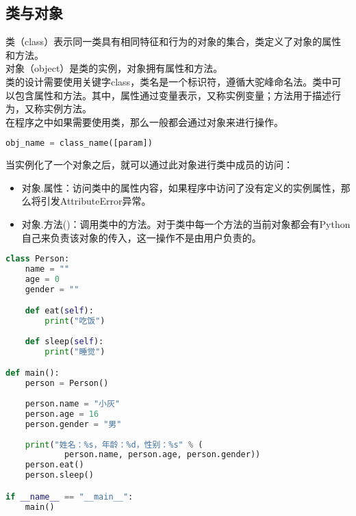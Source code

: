 \subsection{类与对象}

类（class）表示同一类具有相同特征和行为的对象的集合，类定义了对象的属性和方法。\\

对象（object）是类的实例，对象拥有属性和方法。\\

类的设计需要使用关键字class，类名是一个标识符，遵循大驼峰命名法。类中可以包含属性和方法。其中，属性通过变量表示，又称实例变量；方法用于描述行为，又称实例方法。\\

在程序之中如果需要使用类，那么一般都会通过对象来进行操作。

\vspace{-0.5cm}

\begin{lstlisting}[language=Python]
obj_name = class_name([param])
\end{lstlisting}

当实例化了一个对象之后，就可以通过此对象进行类中成员的访问：

\begin{itemize}
	\item 对象.属性：访问类中的属性内容，如果程序中访问了没有定义的实例属性，那么将引发AttributeError异常。

	\item 对象.方法()：调用类中的方法。对于类中每一个方法的当前对象都会有Python自己来负责该对象的传入，这一操作不是由用户负责的。
\end{itemize}

\vspace{0.5cm}


\begin{lstlisting}[language=Python]
class Person:
    name = ""
    age = 0
    gender = ""

    def eat(self):
        print("吃饭")
    
    def sleep(self):
        print("睡觉")

def main():
    person = Person()
    
    person.name = "小灰"
    person.age = 16
    person.gender = "男"
    
    print("姓名：%s，年龄：%d，性别：%s" % (
            person.name, person.age, person.gender))
    person.eat()
    person.sleep()

if __name__ == "__main__":
    main()
\end{lstlisting}

